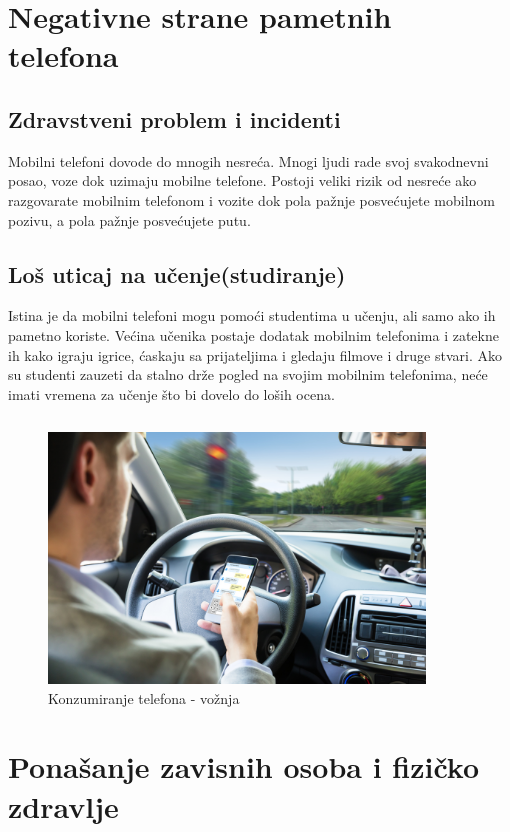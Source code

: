 \documentclass[a4paper]{article}
\begin{document}
\newpage

\section{Negativne strane pametnih telefona}

\subsection{Zdravstveni problem i incidenti}
Mobilni telefoni dovode do mnogih nesreća.
Mnogi ljudi rade svoj svakodnevni posao, voze dok uzimaju mobilne telefone.
Postoji veliki rizik od nesreće ako razgovarate mobilnim telefonom i vozite
dok pola pažnje posvećujete mobilnom pozivu, a pola pažnje posvećujete putu.

\subsection{Loš uticaj na učenje(studiranje)}
Istina je da mobilni telefoni mogu pomoći studentima u učenju,
ali samo ako ih pametno koriste.
Većina učenika postaje dodatak mobilnim telefonima
i zatekne ih kako igraju igrice, ćaskaju sa prijateljima i gledaju filmove
i druge stvari. Ako su studenti zauzeti da stalno drže pogled na svojim
mobilnim telefonima, neće imati vremena za učenje što bi dovelo do loših ocena.

\begin{verbatim}
\end{verbatim}
\begin{figure}[h!]
\centering
\begin{center}
\includegraphics[width=100mm]{image2.jpg}
\end{center}
\caption{Konzumiranje telefona - vožnja}
\label{fig:vr}
\end{figure}


\newpage
\section{Ponašanje zavisnih osoba i fizičko zdravlje}
\end{document}
